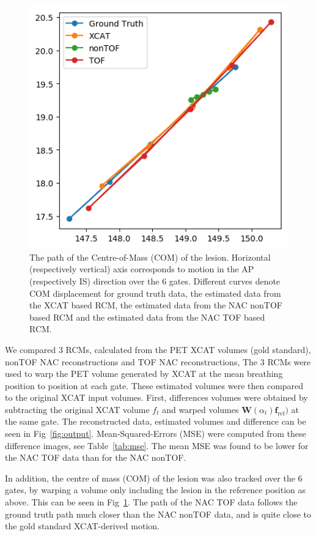 \documentclass{IEEEtran}
\begin{document}
\begin{figure}
    \vspace{-0.2cm}
    
    \centering
    \includegraphics[width=0.7\linewidth]{figures/com_graph.png}
    \caption{The path of the Centre-of-Mass (COM) of the lesion. Horizontal (respectively vertical) axis corresponds to motion in the AP (respectively IS) direction over the $6$ gates. Different curves denote COM displacement for  ground truth data, the estimated data from the XCAT based RCM, the estimated data from the NAC nonTOF based RCM and the estimated data from the NAC TOF based RCM.}
    \label{fig:com_graph}
    
    \vspace{-0.2cm}
\end{figure}

We compared $3$ RCMs, calculated from the PET XCAT volumes (gold standard), nonTOF NAC reconstructions and TOF NAC reconstructions, The $3$ RCMs were used to warp the PET volume generated by XCAT at the mean breathing position to position at each gate. These estimated volumes were then compared to the original XCAT input volumes. First, differences volumes were obtained by subtracting the original XCAT volume $\mathbf{}{f}_t$ and warped volumes $\mathbf{W}(\alpha_t) \mathbf{f}_\mathrm{ref})$ at the same gate. The reconstructed data, estimated volumes and difference can be seen in Fig~\ref{fig:output}. Mean-Squared-Errors (MSE) were computed from these difference images, see Table~\ref{tab:mse}. The mean MSE was found to be lower for the NAC TOF data than for the NAC nonTOF.

In addition, the centre of mass (COM) of the lesion was also tracked over the $6$ gates, by warping a volume only including the lesion in the reference position as above. This can be seen in Fig~\ref{fig:com_graph}. The path of the NAC TOF data follows the ground truth path much closer than the NAC nonTOF data, and is quite close to the gold standard XCAT-derived motion.
\end{document}
